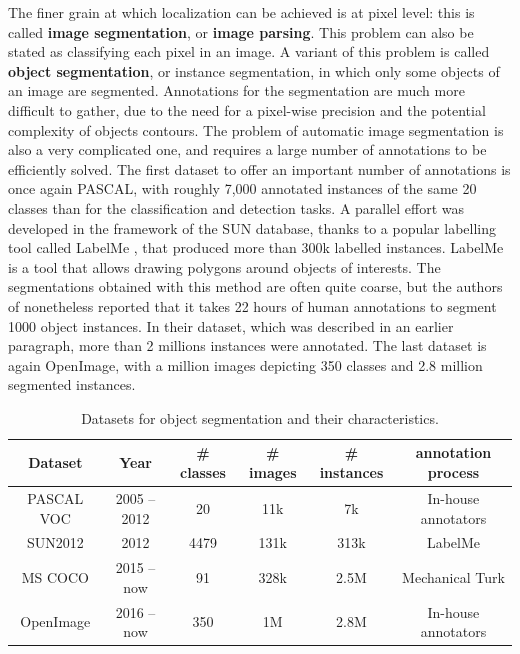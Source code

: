 The finer grain at which localization can be achieved is at pixel level: this is called \textbf{image segmentation}, or \textbf{image parsing}. This problem can also be stated as classifying each pixel in an image. A variant of this problem is called \textbf{object segmentation}, or instance segmentation, in which only some objects of an image are segmented. Annotations for the segmentation are much more difficult to gather, due to the need for a pixel-wise precision and the potential complexity of objects contours. The problem of automatic image segmentation is also a very complicated one, and requires a large number of annotations to be efficiently solved. The first dataset to offer an important number of annotations is once again PASCAL, with roughly 7,000 annotated instances of the same 20 classes than for the classification and detection tasks. A parallel effort was developed in the framework of the SUN database, thanks to a popular labelling tool called LabelMe \cite{russell2008labelme}, that produced more than 300k labelled instances. LabelMe is a tool that allows drawing polygons around objects of interests. The segmentations obtained with this method are often quite coarse, but the authors of \cite{lin2014microsoft} nonetheless reported that it takes 22 hours of human annotations to segment 1000 object instances. In their dataset, which was described in an earlier paragraph, more than 2 millions instances were annotated. The last dataset is again OpenImage, with a million images depicting 350 classes and 2.8 million segmented instances.

\vspace{0.5cm}

\begin{table}
	\centering
	\caption{Datasets for object segmentation and their characteristics.}
	\begin{tabular}{|c|c|c|c|c|c|}
		\hline
		Dataset & Year & \# classes & \# images & \# instances & annotation process \\
		\hline
		PASCAL VOC \cite{Everingham10} & 2005 -- 2012 & 20 & 11k & 7k & In-house annotators \\
		SUN2012 \cite{xiao2010sun} & 2012 & 4479 & 131k & 313k & LabelMe \cite{russell2008labelme,barriuso2012notes} \\
		MS COCO \cite{lin2014microsoft} & 2015 -- now & 91 & 328k & 2.5M & Mechanical Turk \\
		OpenImage \cite{OpenImages, OpenImages2} & 2016 -- now & 350 & 1M & 2.8M & In-house annotators \\
		\hline
	\end{tabular}
	\label{tab:segmentation_ds}
\end{table}


